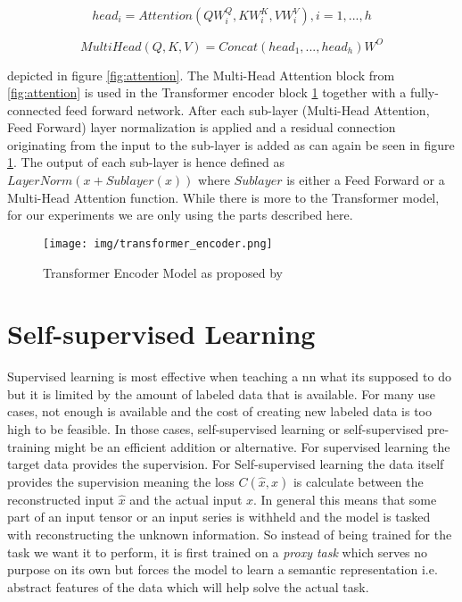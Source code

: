 \begin{equation}
	head_i = Attention(QW^Q_i, KW^K_i, VW^V_i), i = 1, ..., h
\end{equation}

\begin{equation}
	MultiHead(Q,K,V) = Concat(head_1, ..., head_h)W^O
\end{equation}

depicted in figure \ref{fig:attention}. The Multi-Head Attention block from \ref{fig:attention} is
used in the Transformer encoder block \ref{fig:transformer_encoder} together with a fully-connected feed forward network. After each sub-layer (Multi-Head Attention, Feed Forward) layer normalization is applied and a residual connection originating from the input to the sub-layer is added as can again be seen in figure \ref{fig:transformer_encoder}. The output of each sub-layer is hence defined as $LayerNorm(x + Sublayer(x))$ where $Sublayer$ is either a Feed Forward or a Multi-Head Attention function. While there is more to the Transformer model, for our experiments we are only using the parts described here.

\begin{figure}[h]
	\centering
	\texttt{[image: img/transformer\_encoder.png]}
	\caption{Transformer Encoder Model as proposed by \cite{attention_origin}}
	\label{fig:transformer_encoder}
\end{figure}

\section{Self-supervised Learning}

Supervised learning is most effective when teaching a \gls{nn} what its supposed to do but it is limited by the amount of labeled data that is available. For many use cases, not enough is available and the cost of creating new labeled data is too high to be feasible. In those cases, self-supervised learning or self-supervised pre-training might be an efficient addition or alternative. For supervised learning the target data provides the supervision. For Self-supervised learning the data itself provides the supervision meaning the loss $C(\hat{x},x)$ is calculate between the reconstructed input $\hat{x}$ and the actual input $x$. In general this means that some part of an input tensor or an input series is withheld and the model is tasked with reconstructing the unknown information. So instead of being trained for the task we want it to perform, it is first trained on a \textit{proxy task} which serves no purpose on its own but forces the model to learn a semantic representation i.e. abstract features of the data which will help solve the actual task. 

